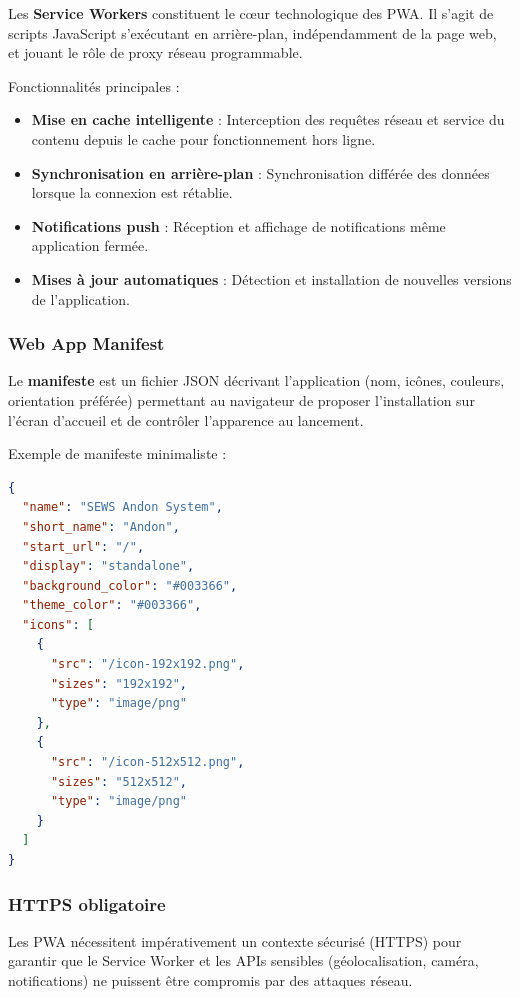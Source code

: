 Les \textbf{Service Workers} constituent le cœur technologique des PWA. Il s'agit de scripts JavaScript s'exécutant en arrière-plan, indépendamment de la page web, et jouant le rôle de proxy réseau programmable.

Fonctionnalités principales :
\begin{itemize}
    \item \textbf{Mise en cache intelligente} : Interception des requêtes réseau et service du contenu depuis le cache pour fonctionnement hors ligne.
    \item \textbf{Synchronisation en arrière-plan} : Synchronisation différée des données lorsque la connexion est rétablie.
    \item \textbf{Notifications push} : Réception et affichage de notifications même application fermée.
    \item \textbf{Mises à jour automatiques} : Détection et installation de nouvelles versions de l'application.
\end{itemize}


\subsubsection{Web App Manifest}

Le \textbf{manifeste} est un fichier JSON décrivant l'application (nom, icônes, couleurs, orientation préférée) permettant au navigateur de proposer l'installation sur l'écran d'accueil et de contrôler l'apparence au lancement.

Exemple de manifeste minimaliste :
\begin{lstlisting}[language=json,caption={Exemple de manifeste PWA}]
{
  "name": "SEWS Andon System",
  "short_name": "Andon",
  "start_url": "/",
  "display": "standalone",
  "background_color": "#003366",
  "theme_color": "#003366",
  "icons": [
    {
      "src": "/icon-192x192.png",
      "sizes": "192x192",
      "type": "image/png"
    },
    {
      "src": "/icon-512x512.png",
      "sizes": "512x512",
      "type": "image/png"
    }
  ]
}
\end{lstlisting}

\subsubsection{HTTPS obligatoire}

Les PWA nécessitent impérativement un contexte sécurisé (HTTPS) pour garantir que le Service Worker et les APIs sensibles (géolocalisation, caméra, notifications) ne puissent être compromis par des attaques réseau.

